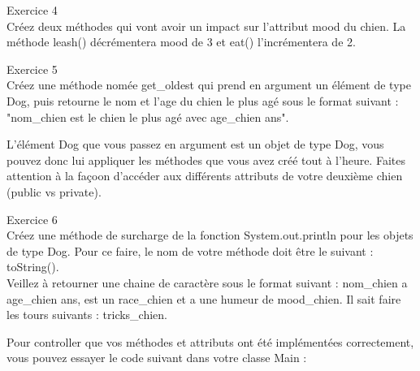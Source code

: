 \begin{Exercice} Exercice 4\\
    Créez deux méthodes qui vont avoir un impact sur l'attribut mood du chien. La méthode leash() décrémentera mood de 3 et eat() l'incrémentera de 2. \\

\begin{solution}
	
\end{solution}
\end{Exercice}

\begin{Exercice} Exercice 5\\
    Créez une méthode nomée get\_oldest qui prend en argument un élément de type Dog, puis retourne le nom et l'age du chien le plus agé sous le format suivant : "nom\_chien est le chien le plus agé avec age\_chien ans". \\
   	
\begin{conseil}
   L'élément Dog que vous passez en argument est un objet de type Dog, vous pouvez donc lui appliquer les méthodes que vous avez créé tout à l'heure.
   Faites attention à la façoon d'accéder aux différents attributs de votre deuxième chien (public vs private).
\end{conseil}
    
\begin{solution}
	
\end{solution}
\end{Exercice}

\begin{Exercice} Exercice 6\\
    Créez une méthode de surcharge de la fonction System.out.println pour les objets de type Dog. Pour ce faire, le nom de votre méthode doit être le suivant : toString(). \\
    Veillez à retourner une chaine de caractère sous le format suivant : nom\_chien a age\_chien ans, est un race\_chien et a une humeur de mood\_chien. Il sait faire les tours suivants : tricks\_chien.

\begin{solution}
	
\end{solution}
\end{Exercice}

Pour controller que vos méthodes et attributs ont été implémentées correctement, vous pouvez essayer le code suivant dans votre classe Main :

